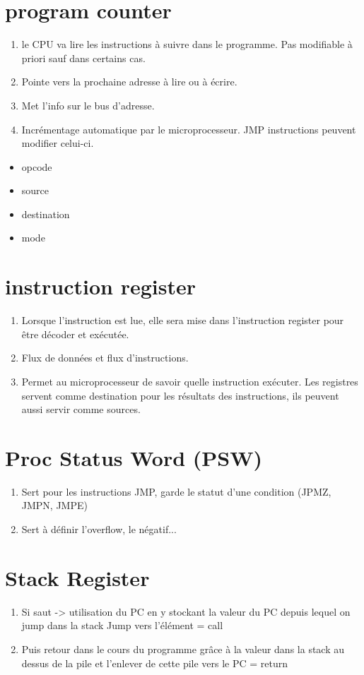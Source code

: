 \section{program counter}
\begin{enumerate}
\item le CPU va lire les instructions à suivre dans le programme. Pas modifiable à priori sauf dans certains cas. 
\item Pointe vers la prochaine adresse à lire ou à écrire.
\item Met l'info sur le bus d'adresse.
\item Incrémentage automatique par le microprocesseur. JMP instructions peuvent modifier celui-ci.
\end{enumerate}
\begin{itemize}
  \item opcode
  \item source
  \item destination
  \item mode
\end{itemize}

\section{instruction register}
\begin{enumerate}
  \item Lorsque l'instruction est lue, elle sera mise dans l'instruction register pour être décoder et exécutée. 
  \item Flux de données et flux d'instructions. 
  \item Permet au microprocesseur de savoir quelle instruction exécuter. Les registres servent comme destination pour les résultats des instructions, ils peuvent aussi servir comme sources.
\end{enumerate}

\section{Proc Status Word (PSW)}
\begin{enumerate}
  \item Sert pour les instructions JMP, garde le statut d'une condition (JPMZ, JMPN, JMPE)
  \item Sert à définir l'overflow, le négatif...
\end{enumerate}

\section{Stack Register}
\begin{enumerate}
\item Si saut -> utilisation du PC en y stockant la valeur du PC depuis lequel on jump dans la stack
Jump vers l'élément = call 
\item Puis retour dans le cours du programme grâce à la valeur dans la stack au dessus de la pile et l'enlever de cette pile vers le PC = return 
\end{enumerate}

